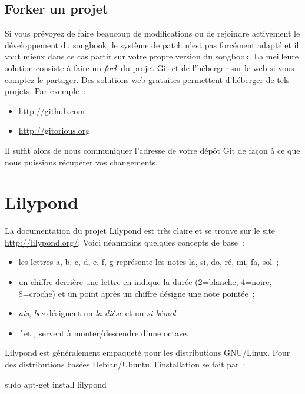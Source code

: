 \subsection{Forker un projet}

Si vous prévoyez de faire beaucoup de modifications ou de rejoindre
activement le développement du songbook, le système de patch n'est pas
forcément adapté et il vaut mieux dans ce cas partir sur votre propre
version du songbook. La meilleure solution consiste à faire un
\emph{fork} du projet Git et de l'héberger sur le web si vous comptez
le partager. Des solutions web gratuites permettent d'héberger de tels
projets. Par exemple~:

\begin{itemize}
\item \url{http://github.com}
\item \url{http://gitorious.org}
\end{itemize}

Il suffit alors de nous communiquer l'adresse de votre dépôt Git de
façon à ce que nous puissions récupérer vos changements.

\section{Lilypond}

La documentation du projet Lilypond est très
claire et se trouve sur le site \url{http://lilypond.org/}.
Voici néanmoins quelques concepts de base~:

\begin{itemize}
\item les lettres a, b, c, d, e, f, g représente les notes la, si, do,
  ré, mi, fa, sol~;
\item un chiffre derrière une lettre en indique la durée (2=blanche, 4=noire,
  8=croche) et un point après un chiffre désigne une note pointée~;
\item \emph{ais}, \emph{bes} désignent un \emph{la dièse} et un \emph{si bémol}
\item \emph{'} et \emph{,} servent à monter/descendre d'une octave.
\end{itemize}

Lilypond est généralement empaqueté pour les distributions
GNU/Linux. Pour des distributions basées Debian/Ubuntu, l'installation
se fait par~:

\begin{unix}
  sudo apt-get install lilypond
\end{unix}

